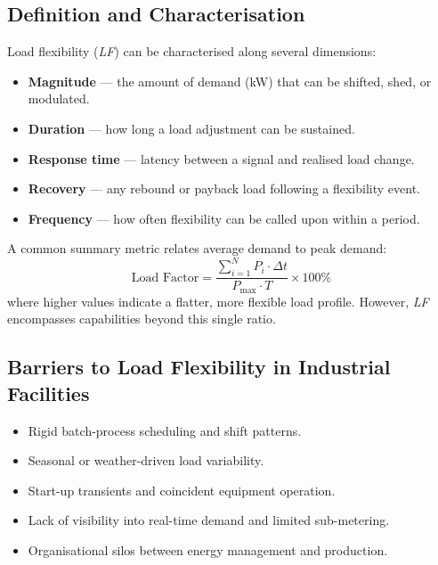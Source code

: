 \documentclass[12pt, a4paper, twocolumn]{article}
\newcommand{\LF}{\textit{LF}}
\begin{document}
\subsection{Definition and Characterisation}
Load flexibility (\LF{}) can be characterised along several dimensions:
\begin{itemize}[nosep]
  \item \textbf{Magnitude} — the amount of demand (kW) that can be shifted, shed, or modulated.
  \item \textbf{Duration} — how long a load adjustment can be sustained.
  \item \textbf{Response time} — latency between a signal and realised load change.
  \item \textbf{Recovery} — any rebound or payback load following a flexibility event.
  \item \textbf{Frequency} — how often flexibility can be called upon within a period.
\end{itemize}

A common summary metric relates average demand to peak demand:
\begin{equation}
  \text{Load Factor} = \frac{\displaystyle\sum_{i=1}^{N} P_i \cdot \Delta t}{P_{\max} \cdot T} \times 100\%
  \label{eq:lf}
\end{equation}
where higher values indicate a flatter, more flexible load profile.  However, \LF{} encompasses capabilities beyond this single ratio.

\subsection{Barriers to Load Flexibility in Industrial Facilities}
\begin{itemize}[nosep]
  \item Rigid batch-process scheduling and shift patterns.
  \item Seasonal or weather-driven load variability.
  \item Start-up transients and coincident equipment operation.
  \item Lack of visibility into real-time demand and limited sub-metering.
  \item Organisational silos between energy management and production.
\end{itemize}
\end{document}

